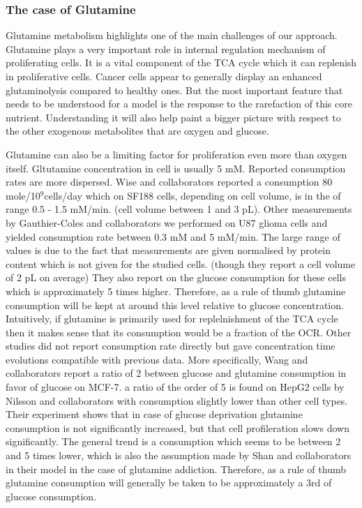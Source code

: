 \documentclass[11pt,a4paper]{article}
\begin{document}
\subsubsection{The case of Glutamine}
Glutamine metabolism highlights one of the main challenges of our approach. Glutamine plays a very important role in internal regulation mechanism of proliferating cells. It is a vital component of the  TCA cycle which it can replenish in proliferative cells.\cite{Villar2015} Cancer cells appear to generally display an enhanced glutaminolysis compared to healthy ones.\cite{Wise2008} But the most important feature that needs to be understood for a model is the response to the rarefaction of this core nutrient. Understanding it will also help paint a bigger picture with respect to the other exogenous metabolites that are oxygen and glucose.

Glutamine can also be a limiting factor for proliferation even more than oxygen itself. Gltutamine concentration in cell is usually 5 mM. Reported consumption rates are more dispersed. Wise and collaborators reported a consumption 80 \textmu mole/10$^9$cells/day which on SF188 cells, depending on cell volume, is in the of range 0.5 - 1.5 mM/min.\cite{Wise2008} (cell volume between 1 and 3 pL). Other measurements by Gauthier-Coles and collaborators we performed on U87 glioma cells and yielded consumption rate between 0.3 mM and 5 mM/min. The large range of values is due to the fact that measurements are given normalised by protein content which is not given for the studied cells. (though they report a cell volume of 2 pL on average)\cite{Gauthier2021} They also report on the glucose consumption for these cells which is approximately 5 times higher. Therefore, as a rule of thumb glutamine consumption will be kept at around this level relative to glucose concentration. Intuitively, if glutamine is primarily used for replelnishment of the TCA cycle then it makes  sense  that its consumption would be a fraction of the OCR. Other studies did not  report consumption rate directly but gave concentration time evolutions compatible with previous data. More specifically, Wang and collaborators report a ratio of 2 between glucose and glutamine consumption in favor of glucose on MCF-7.\cite{Wang2018} a ratio of the order of 5 is found on HepG2 cells by Nilsson and collaborators with consumption slightly lower than other cell types\cite{Nilsson2020}. Their experiment shows that in case of glucose deprivation glutamine consumption is not significantly increased, but that cell profileration slows down significantly. The general trend is a consumption which seems to be between 2 and 5 times lower, which is also the assumption made by Shan and collaborators in their model in the case of glutamine addiction. \cite{Shan2018} Therefore, as a rule of thumb glutamine consumption will generally be taken to be approximately a 3rd of glucose consumption.
\end{document}
